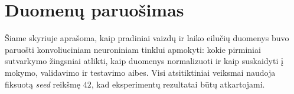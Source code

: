 \section{Duomenų paruošimas}
\label{sec:duomenu_paruosimas}

Šiame skyriuje aprašoma, kaip pradiniai vaizdų ir laiko eilučių duomenys buvo paruošti konvoliuciniam neuroniniam tinklui apmokyti: kokie pirminiai sutvarkymo žingsniai atlikti, kaip duomenys normalizuoti ir kaip suskaidyti į mokymo, validavimo ir testavimo aibes. Visi atsitiktiniai veiksmai naudoja fiksuotą \textit{seed} reikšmę $42$, kad eksperimentų rezultatai būtų atkartojami.




